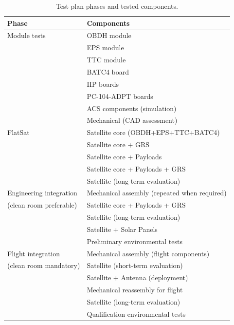 \begin{table}[!ht]
    \begin{center}
        \begin{tabular}{ll}
            \toprule[1.5pt]
            \textbf{Phase}    & \textbf{Components}       \\
            \midrule
            Module tests             & OBDH module \\
                                     & EPS module \\
                                     & TTC module \\
                                     & BATC4 board \\
                                     & IIP boards \\
                                     & PC-104-ADPT boards \\
                                     & ACS components (simulation) \\
                                     & Mechanical (CAD assessment) \\
            \midrule
            FlatSat                  & Satellite core (OBDH+EPS+TTC+BATC4) \\
                                     & Satellite core + GRS \\
                                     & Satellite core + Payloads \\
                                     & Satellite core + Payloads + GRS \\
                                     & Satellite (long-term evaluation) \\
            \midrule
            Engineering integration  & Mechanical assembly (repeated when required) \\
            (clean room preferable)  & Satellite core + Payloads + GRS \\
                                     & Satellite (long-term evaluation) \\
                                     & Satellite + Solar Panels \\
                                     & Preliminary environmental tests \\ 
            \midrule
            Flight integration       & Mechanical assembly (flight components) \\
            (clean room mandatory)   & Satellite (short-term evaluation) \\
                                     & Satellite + Antenna (deployment) \\
                                     & Mechanical reassembly for flight \\
                                     & Satellite (long-term evaluation) \\
                                     & Qualification environmental tests \\ 
            \bottomrule[1.5pt]
        \end{tabular}
        \caption{Test plan phases and tested components.}
        \label{tab:test-plan}
    \end{center}
\end{table}

